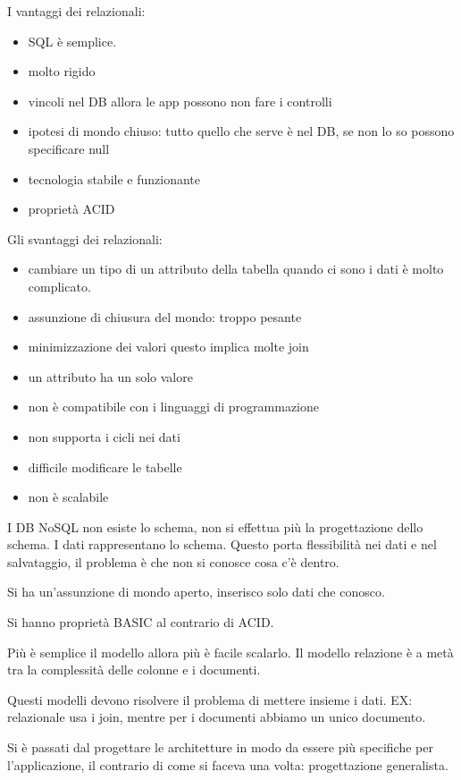 I vantaggi dei relazionali:
\begin{itemize}
    \item SQL è semplice.
    \item molto rigido
    \item vincoli nel DB allora le app possono non fare i controlli
    \item ipotesi di mondo chiuso: tutto quello che serve è nel DB, se non lo so possono
    specificare null
    \item tecnologia stabile e funzionante
    \item proprietà ACID
\end{itemize}
Gli svantaggi dei relazionali:
\begin{itemize}
    \item cambiare un tipo di un attributo della tabella quando ci sono i dati 
    è molto complicato.
    \item assunzione di chiusura del mondo: troppo pesante
    \item minimizzazione dei valori questo implica molte join
    \item un attributo ha un solo valore
    \item non è compatibile con i linguaggi di programmazione
    \item non supporta i cicli nei dati
    \item difficile modificare le tabelle
    \item non è scalabile
\end{itemize}

I DB NoSQL non esiste lo schema, non si effettua più la progettazione dello schema.
I dati rappresentano lo schema. Questo porta flessibilità nei dati e nel salvataggio,
il problema è che non si conosce cosa c'è dentro.

Si ha un'assunzione di mondo aperto, inserisco solo dati che conosco.

Si hanno proprietà BASIC al contrario di ACID.

Più è semplice il modello allora più è facile scalarlo. Il modello relazione 
è a metà tra la complessità delle colonne e i documenti.

Questi modelli devono risolvere il problema di mettere insieme i dati. EX: relazionale 
usa i join, mentre per i documenti abbiamo un unico documento.

Si è passati dal progettare le architetture in modo da essere più specifiche 
per l'applicazione, il contrario di come si faceva una volta: progettazione generalista.



